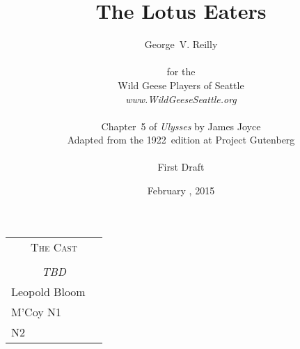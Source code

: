 



\title{\Huge The Lotus Eaters}
\author{George~V. Reilly\\
\\
{\small for the}\\
Wild Geese Players of Seattle\\
{\emph{www.WildGeeseSeattle.org}}\\
\\
{\small Chapter~5 of \emph{Ulysses} by James Joyce}\\
{\small Adapted from the 1922~edition at Project Gutenberg}
\\
\\
{\small First Draft}}
\date{February , 2015}
\raggedbottom



\maketitle
\thispagestyle{empty}
\pagebreak

\begin{tabular}{lp{10cm}}
    \multicolumn{2}{c}{\Large \textsc{The Cast}} \\
\\
    \multicolumn{2}{c}{\large \textit{TBD}} \\
Leopold Bloom \\
M'Coy
N1 \\
N2 \\
\end{tabular}

\thispagestyle{empty}
\newpage


\setcounter{page}{1}













